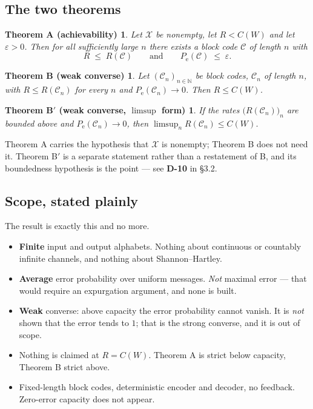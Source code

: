 \documentclass[11pt,a4paper]{article}
\newtheorem*{thmA}{Theorem A (achievability)}
\newtheorem*{thmB}{Theorem B (weak converse)}
\newtheorem*{thmBp}{Theorem B$'$ (weak converse, $\limsup$ form)}
\newcommand{\X}{\mathcal{X}}
\newcommand{\Pe}{P_{\mathrm{e}}}
\newcommand{\code}{\mathcal{C}}
\begin{document}
\subsection{The two theorems}

\begin{thmA}
Let $\X$ be nonempty, let $R < C(W)$ and let $\varepsilon>0$. Then for all
sufficiently large $n$ there exists a block code $\code$ of length $n$ with
\[
  R \;\le\; R(\code)
  \qquad\text{and}\qquad
  \Pe(\code) \;\le\; \varepsilon .
\]
\end{thmA}

\begin{thmB}
Let $(\code_n)_{n\in\mathbb N}$ be block codes, $\code_n$ of length $n$, with
$R \le R(\code_n)$ for every $n$ and $\Pe(\code_n)\to 0$. Then $R \le C(W)$.
\end{thmB}

\begin{thmBp}
If the rates $\bigl(R(\code_n)\bigr)_n$ are bounded above and
$\Pe(\code_n)\to 0$, then $\limsup_{n} R(\code_n) \le C(W)$.
\end{thmBp}

Theorem A carries the hypothesis that $\X$ is nonempty; Theorem B does not need
it. Theorem B$'$ is a separate statement rather than a restatement of B, and its
boundedness hypothesis is the point --- see \textbf{D-10} in \S3.2.

\subsection{Scope, stated plainly}

The result is exactly this and no more.

\begin{itemize}
  \item \textbf{Finite} input and output alphabets. Nothing about continuous or
        countably infinite channels, and nothing about Shannon--Hartley.
  \item \textbf{Average} error probability over uniform messages. \emph{Not}
        maximal error --- that would require an expurgation argument, and none is
        built.
  \item \textbf{Weak} converse: above capacity the error probability cannot
        vanish. It is \emph{not} shown that the error tends to $1$; that is the
        strong converse, and it is out of scope.
  \item Nothing is claimed at $R = C(W)$. Theorem A is strict below capacity,
        Theorem B strict above.
  \item Fixed-length block codes, deterministic encoder and decoder, no feedback.
        Zero-error capacity does not appear.
\end{itemize}
\end{document}
